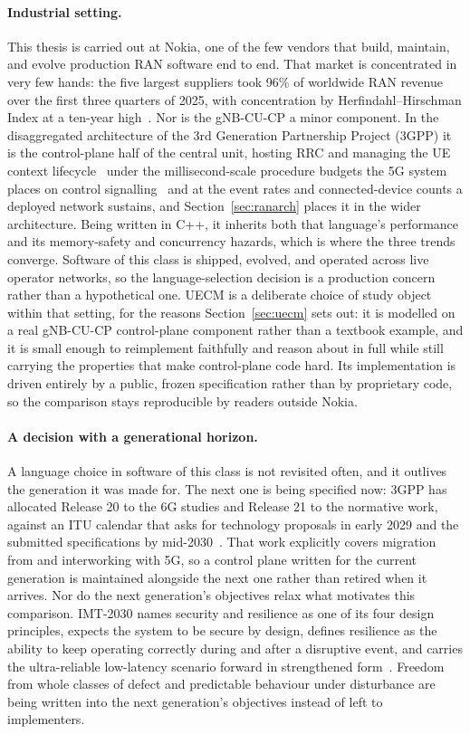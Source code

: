 \documentclass[english,oneside,a4paper,censored,csm,software-track-2020]{HYthesisML}
\begin{document}
\paragraph{Industrial setting.}
This thesis is carried out at Nokia, one of the few vendors that build, maintain, and evolve
production RAN software end to end. That market is concentrated in very few hands: the five
largest suppliers took 96\% of worldwide RAN revenue over the first three quarters of 2025, with
concentration by Herfindahl--Hirschman Index at a ten-year
high~\cite{delloro2025ran3q,delloro2026ran}. Nor is the gNB-CU-CP a minor component. In the
disaggregated architecture of the 3rd Generation Partnership Project (3GPP) it is the
control-plane half of the central unit, hosting RRC and managing the UE context
lifecycle~\cite{3gpp38401,3gpp38331} under the millisecond-scale procedure budgets the 5G system
places on control signalling~\cite{3gpp38913} and at the event rates and connected-device counts
a deployed network sustains, and Section~\ref{sec:ranarch} places it in the wider architecture.
Being written in C++, it inherits both that language's performance and its memory-safety and
concurrency hazards, which is where the three trends converge. Software of this class is shipped,
evolved, and operated across live operator networks, so the language-selection decision is a
production concern rather than a hypothetical one. UECM is a deliberate choice of study object
within that setting, for the reasons Section~\ref{sec:uecm} sets out: it is modelled on a real
gNB-CU-CP control-plane component rather than a textbook example, and it is small enough to
reimplement faithfully and reason about in full while still carrying the properties that make
control-plane code hard. Its implementation is driven entirely by a public, frozen specification
rather than by proprietary code, so the comparison stays reproducible by readers outside Nokia.

\paragraph{A decision with a generational horizon.}
A language choice in software of this class is not revisited often, and it outlives the
generation it was made for. The next one is being specified now: 3GPP has allocated Release 20 to
the 6G studies and Release 21 to the normative work, against an ITU calendar that asks for
technology proposals in early 2029 and the submitted specifications by
mid-2030~\cite{3gpp2024road6g}. That work explicitly covers migration from and interworking with
5G, so a control plane written for the current generation is maintained alongside the next one
rather than retired when it arrives. Nor do the next generation's objectives relax what motivates
this comparison. IMT-2030 names security and resilience as one of its four design principles,
expects the system to be secure by design, defines resilience as the ability to keep operating
correctly during and after a disruptive event, and carries the ultra-reliable low-latency
scenario forward in strengthened form~\cite{itu2023imt2030}. Freedom from whole classes of defect
and predictable behaviour under disturbance are being written into the next generation's
objectives instead of left to implementers.
\end{document}
